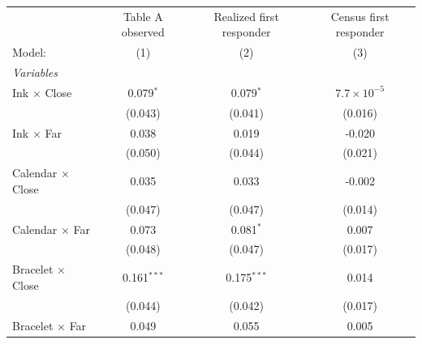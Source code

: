 
 
\caption{\label{tab:first-responder-selection-diagnostics} Selection Margins for Table A Observability}
\centering
\begin{tabular}{lccc}
   \tabularnewline \midrule \midrule
                                                                         & Table A observed & Realized first responder & Census first responder \\   
   Model:                                                                & (1)              & (2)                      & (3)\\  
   \midrule
   \emph{Variables}\\
   Ink $\times$ Close                                                    & 0.079$^{*}$      & 0.079$^{*}$              & $7.7\times 10^{-5}$\\    
                                                                         & (0.043)          & (0.041)                  & (0.016)\\   
   Ink $\times$ Far                                                      & 0.038            & 0.019                    & -0.020\\   
                                                                         & (0.050)          & (0.044)                  & (0.021)\\   
   Calendar $\times$ Close                                               & 0.035            & 0.033                    & -0.002\\   
                                                                         & (0.047)          & (0.047)                  & (0.014)\\   
   Calendar $\times$ Far                                                 & 0.073            & 0.081$^{*}$              & 0.007\\   
                                                                         & (0.048)          & (0.047)                  & (0.017)\\   
   Bracelet $\times$ Close                                               & 0.161$^{***}$    & 0.175$^{***}$            & 0.014\\   
                                                                         & (0.044)          & (0.042)                  & (0.017)\\   
   Bracelet $\times$ Far                                                 & 0.049            & 0.055                    & 0.005\\   

\end{tabular}
